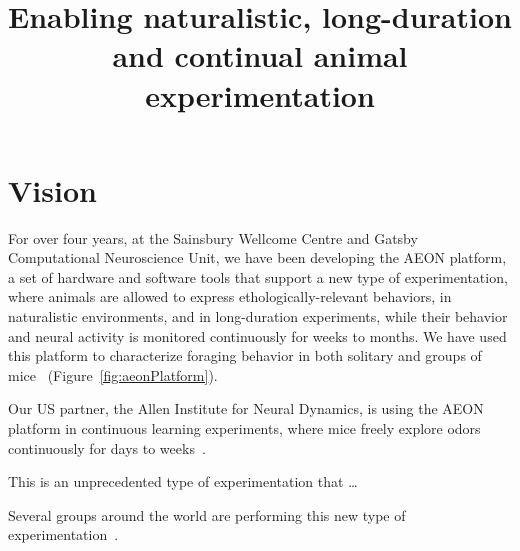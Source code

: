 \documentclass[12pt]{article}
\title{Enabling naturalistic, long-duration and continual animal experimentation}
\begin{document}
\maketitle

\section{Vision}

For over four years, at the Sainsbury Wellcome Centre and Gatsby Computational
Neuroscience Unit, we have been developing the AEON platform, a set of hardware
and software tools that support a new type of experimentation, where animals
are allowed to express ethologically-relevant behaviors, in naturalistic
environments, and in long-duration experiments, while their behavior and
neural activity is monitored continuously for weeks to months.
%
We have used this platform to characterize foraging behavior in both solitary
and groups of mice~\citep{aeonRepo} (Figure~\ref{fig:aeonPlatform}).

Our US partner, the Allen Institute for Neural Dynamics, is using the AEON
platform in continuous learning experiments, where mice freely explore odors
continuously for days to weeks~\citep{carlsPapers}.

This is an unprecedented type of experimentation that \ldots

Several groups around the world are performing this new type of
experimentation~\cite{}.
\end{document}
